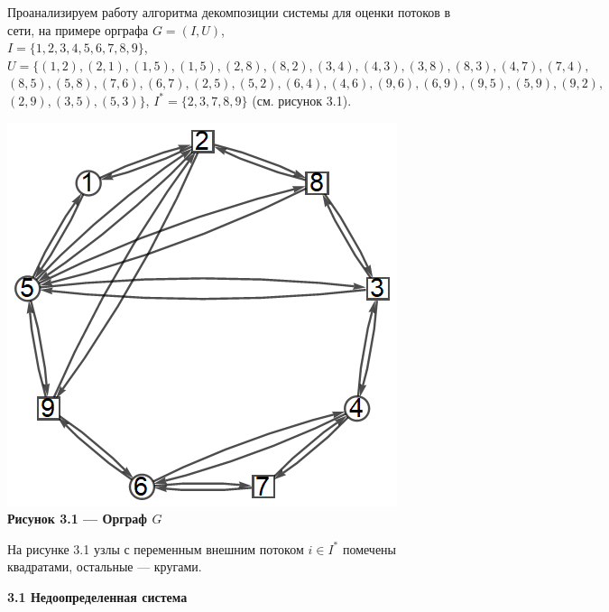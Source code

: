 \documentclass[14pt]{extarticle}%
\begin{document}
Проанализируем работу алгоритма декомпозиции системы для оценки потоков в сети, на примере орграфа $G=(I,U)$,\\ $I=\{1,2,3,4,5,6,7,8,9\}$, \\$U=\{(1,2), (2,1), (1,5),(1,5), (2,8),(8,2), (3,4),(4,3), (3,8), (8,3), (4,7),(7,4),$\\ $(8,5), (5,8), (7,6), (6,7), (2,5),(5,2), (6,4),(4,6), (9,6),(6,9), (9,5),(5,9), (9,2),$\\$(2,9), (3,5),(5,3)\}$, $I^*=\{2,3,7,8,9\}$ (см. рисунок 3.1).

\begin{center}
\includegraphics[scale=0.7]{grs/gBase.png}\\
\textbf{Рисунок 3.1 --- Орграф $G$}
\end{center}

На рисунке 3.1 узлы с переменным внешним потоком $i\in I^*$ помечены квадратами, остальные --- кругами.

\textbf{3.1 Недоопределенная система}
\end{document}
